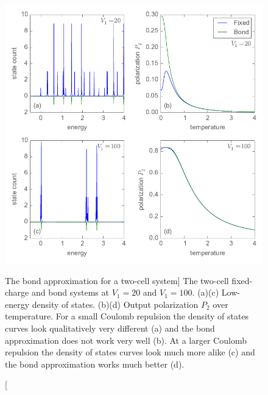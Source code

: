 \begin{figure}
  \center
  \includegraphics{bond_approximation2}
  \caption
  [The bond approximation for a two-cell system]
  {
  The two-cell fixed-charge and bond systems at $V_1 = 20$ and $V_1 = 100$.
  (a)(c) Low-energy density of states. (b)(d) Output polarization $P_2$ over
  temperature. For a small Coulomb repulsion the density of states curves look
  qualitatively very different (a) and the bond approximation does not work very
  well (b). At a larger Coulomb repulsion the density of states curves look much
  more alike (c) and the bond approximation works much better (d).
  }
  \label{fig:bond_approximation2}
\end{figure}

